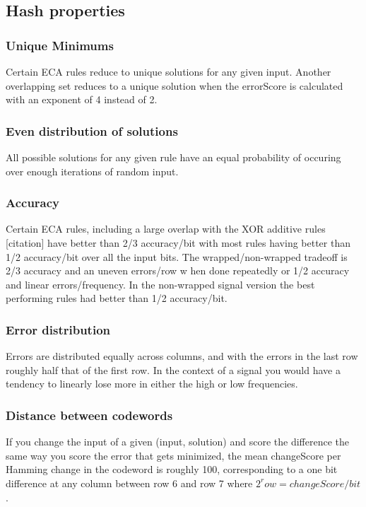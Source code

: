 \documentclass[11pt]{article}
\begin{document}
\subsection{Hash properties}

\subsubsection{Unique Minimums}
Certain ECA rules reduce to unique solutions for any given input. Another overlapping set
reduces to a unique solution when the errorScore is calculated with an exponent of 4 instead of 2.
\\
\subsubsection{Even distribution of solutions}
All possible solutions for any given rule have an equal probability of occuring over enough
iterations of random input.
\\
\subsubsection{Accuracy}
Certain ECA rules, including a large overlap with the XOR additive rules [citation] have
better than 2/3 accuracy/bit with most rules having better than 1/2 accuracy/bit over all
the input bits. The wrapped/non-wrapped tradeoff is 2/3 accuracy and an uneven errors/row w
hen done repeatedly or 1/2 accuracy and linear errors/frequency. In the non-wrapped signal
version the best performing rules had better than 1/2 accuracy/bit.
\\
\subsubsection{Error distribution}
Errors are distributed equally across columns, and with the errors in the last row roughly
half that of the first row. In the context of a signal you would have a tendency to linearly
lose more in either the high or low frequencies.
\\
\subsubsection{Distance between codewords}
If you change the input of a given (input, solution) and score the difference the same way
you score the error that gets minimized, the mean changeScore per Hamming change in the
codeword is roughly 100, corresponding to a one bit difference at any column between
row 6 and row 7 where $2^row = changeScore/bit$.
\\
\end{document}

